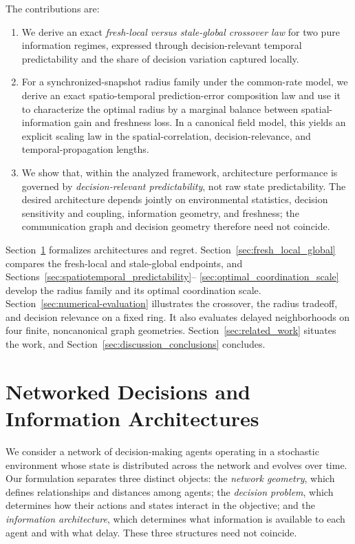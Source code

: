 \documentclass[11pt]{article}
\begin{document}
The contributions are:
\begin{enumerate}
    \item We derive an exact \emph{fresh-local versus stale-global crossover
    law} for two pure information regimes, expressed through decision-relevant
    temporal predictability and the share of decision variation captured
    locally.

    \item For a synchronized-snapshot radius family under the common-rate
    model, we derive an exact spatio-temporal prediction-error composition law
    and use it to characterize the optimal radius by a marginal balance between
    spatial-information gain and freshness loss. In a canonical field model,
    this yields an explicit scaling law in the spatial-correlation,
    decision-relevance, and temporal-propagation lengths.

    \item We show that, within the analyzed framework, architecture performance is governed by
    \emph{decision-relevant predictability}, not raw state predictability. The
    desired architecture depends jointly on environmental statistics, decision
    sensitivity and coupling, information geometry, and freshness; the
    communication graph and decision geometry therefore need not coincide.
\end{enumerate}

Section~\ref{sec:model} formalizes architectures and regret.
Section~\ref{sec:fresh_local_global} compares the fresh-local and stale-global
endpoints, and Sections~\ref{sec:spatiotemporal_predictability}--
\ref{sec:optimal_coordination_scale} develop the radius family and its optimal
coordination scale. Section~\ref{sec:numerical-evaluation} illustrates the crossover, the radius tradeoff, and decision relevance on a fixed ring.
It also evaluates delayed neighborhoods on four finite, noncanonical graph geometries.
Section~\ref{sec:related_work} situates the work, and
Section~\ref{sec:discussion_conclusions} concludes.

\section{Networked Decisions and Information Architectures}
\label{sec:model}

We consider a network of decision-making agents operating in a stochastic
environment whose state is distributed across the network and evolves over
time. Our formulation separates three distinct objects: the
\emph{network geometry}, which defines relationships and distances among
agents; the \emph{decision problem}, which determines how their actions and
states interact in the objective; and the \emph{information architecture},
which determines what information is available to each agent and with what
delay. These three structures need not coincide.
\end{document}
